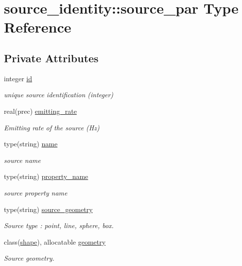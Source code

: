 \hypertarget{structsource__identity_1_1source__par}{}\section{source\+\_\+identity\+:\+:source\+\_\+par Type Reference}
\label{structsource__identity_1_1source__par}
\subsection*{Private Attributes}
\begin{DoxyCompactItemize}
\item 
integer \mbox{\hyperlink{structsource__identity_1_1source__par_a05b6d325908a1b552f98dada275a3465}{id}}
\begin{DoxyCompactList}\small\item\em unique source identification (integer) \end{DoxyCompactList}\item 
real(prec) \mbox{\hyperlink{structsource__identity_1_1source__par_a6e02501b6e0f33bb5e226c1cc38403fa}{emitting\+\_\+rate}}
\begin{DoxyCompactList}\small\item\em Emitting rate of the source (Hz) \end{DoxyCompactList}\item 
type(string) \mbox{\hyperlink{structsource__identity_1_1source__par_a71ef7dc8c6268d014247e0bca3005311}{name}}
\begin{DoxyCompactList}\small\item\em source name \end{DoxyCompactList}\item 
type(string) \mbox{\hyperlink{structsource__identity_1_1source__par_a0205c62b7673e76c7f1de2bfcecabd84}{property\+\_\+name}}
\begin{DoxyCompactList}\small\item\em source property name \end{DoxyCompactList}\item 
type(string) \mbox{\hyperlink{structsource__identity_1_1source__par_a088f264b78200deb737b873025837ec6}{source\+\_\+geometry}}
\begin{DoxyCompactList}\small\item\em Source type \+: \textquotesingle{}point\textquotesingle{}, \textquotesingle{}line\textquotesingle{}, \textquotesingle{}sphere\textquotesingle{}, \textquotesingle{}box\textquotesingle{}. \end{DoxyCompactList}\item 
class(\mbox{\hyperlink{structgeometry_1_1shape}{shape}}), allocatable \mbox{\hyperlink{structsource__identity_1_1source__par_a96d4d1aebbc4cf365220f0bf0eabca97}{geometry}}
\begin{DoxyCompactList}\small\item\em Source geometry. \end{DoxyCompactList}\end{DoxyCompactItemize}


